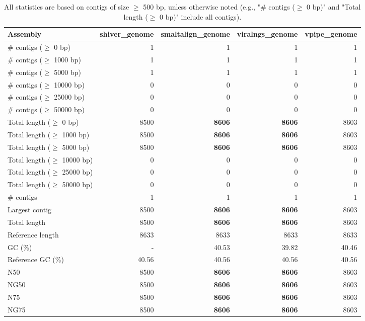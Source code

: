 \documentclass[12pt,a4paper]{article}
\begin{document}
\begin{table}[ht]
\begin{center}
\caption{All statistics are based on contigs of size $\geq$ 500 bp, unless otherwise noted (e.g., "\# contigs ($\geq$ 0 bp)" and "Total length ($\geq$ 0 bp)" include all contigs).}
\begin{tabular}{|l*{4}{|r}|}
\hline
Assembly & shiver\_genome & smaltalign\_genome & viralngs\_genome & vpipe\_genome \\ \hline
\# contigs ($\geq$ 0 bp) & 1 & 1 & 1 & 1 \\ \hline
\# contigs ($\geq$ 1000 bp) & 1 & 1 & 1 & 1 \\ \hline
\# contigs ($\geq$ 5000 bp) & 1 & 1 & 1 & 1 \\ \hline
\# contigs ($\geq$ 10000 bp) & 0 & 0 & 0 & 0 \\ \hline
\# contigs ($\geq$ 25000 bp) & 0 & 0 & 0 & 0 \\ \hline
\# contigs ($\geq$ 50000 bp) & 0 & 0 & 0 & 0 \\ \hline
Total length ($\geq$ 0 bp) & 8500 & {\bf 8606} & {\bf 8606} & 8603 \\ \hline
Total length ($\geq$ 1000 bp) & 8500 & {\bf 8606} & {\bf 8606} & 8603 \\ \hline
Total length ($\geq$ 5000 bp) & 8500 & {\bf 8606} & {\bf 8606} & 8603 \\ \hline
Total length ($\geq$ 10000 bp) & 0 & 0 & 0 & 0 \\ \hline
Total length ($\geq$ 25000 bp) & 0 & 0 & 0 & 0 \\ \hline
Total length ($\geq$ 50000 bp) & 0 & 0 & 0 & 0 \\ \hline
\# contigs & 1 & 1 & 1 & 1 \\ \hline
Largest contig & 8500 & {\bf 8606} & {\bf 8606} & 8603 \\ \hline
Total length & 8500 & {\bf 8606} & {\bf 8606} & 8603 \\ \hline
Reference length & 8633 & 8633 & 8633 & 8633 \\ \hline
GC (\%) & - & 40.53 & 39.82 & 40.46 \\ \hline
Reference GC (\%) & 40.56 & 40.56 & 40.56 & 40.56 \\ \hline
N50 & 8500 & {\bf 8606} & {\bf 8606} & 8603 \\ \hline
NG50 & 8500 & {\bf 8606} & {\bf 8606} & 8603 \\ \hline
N75 & 8500 & {\bf 8606} & {\bf 8606} & 8603 \\ \hline
NG75 & 8500 & {\bf 8606} & {\bf 8606} & 8603 \\ \hline

\end{tabular}
\end{center}
\end{table}
\end{document}
